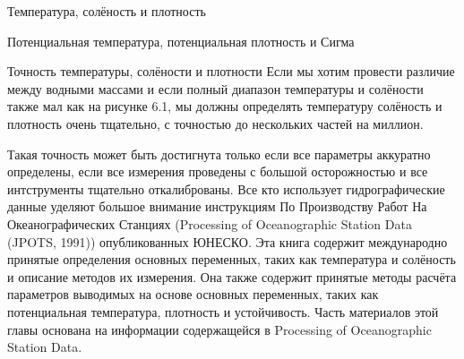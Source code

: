 \begin{chapter}{Температура, солёность и плотность}
\begin{section}{Потенциальная температура, потенциальная плотность и Сигма}
\begin{paragraph}{Точность температуры, солёности и плотности}
Если мы хотим провести различие между водными массами и если полный
диапазон температуры и солёности также мал как на рисунке 6.1, мы
должны определять температуру солёность и плотность очень тщательно, с
точностью до нескольких частей на миллион.
%

Такая точность может быть достигнута только если все параметры
аккуратно определены, если все измерения проведены с большой
осторожностью и все интструменты тщательно откалиброваны. Все кто
использует гидрографические данные уделяют большое внимание
инструкциям По Производству Работ На Океанографических Станциях
(Processing of Oceanographic Station Data (JPOTS, 1991))
опубликованных ЮНЕСКО. Эта книга содержит международно принятые
определения основных переменных, таких как температура и солёность и
описание методов их измерения. Она также содержит принятые методы
расчёта параметров выводимых на основе основных переменных, таких как
потенциальная температура, плотность и устойчивость. Часть материалов
этой главы основана на информации содержащейся в Processing of
Oceanographic Station Data.
%
\end{paragraph}
\end{section}


\end{chapter}

